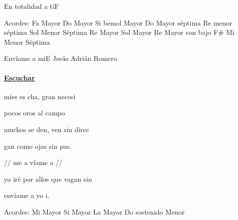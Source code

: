 \documentclass[12pt, spanish]{book}
\begin{document}
\begin{song}{En totalidad a tí}{F}
        \ifChordBk
        \begin{SBOpGroup}
            Acordes:
            \upchord{\F}\qquad Fa Mayor \hfill
            \upchord{\C}\qquad Do Mayor \hfill\null\break
            \upchord{\Bflat}\qquad Si bemol Mayor \hfill
            \upchord{\Cseven}\qquad Do Mayor s\'eptima \hfill\null\break
            \upchord{\Dmseven}\qquad Re menor s\'eptima \hfill
            \upchord{\Gmseven}\qquad Sol Menor S\'eptima \hfill\null\break
            \upchord{\D}\qquad Re Mayor \hfill
            \upchord{\G}\qquad Sol Mayor \hfill\null\break
            \upchord{\DFs}\qquad Re Mayor con bajo F\# \hfill
            \upchord{\Emseven}\qquad Mi Menor S\'eptima \hfill\null\break
        \end{SBOpGroup}
        \fi
    \end{song}

    \begin{song}{Envíame a mi}{E}
    {} %
    {Jesús Adrián Romero}
    {} %
    {}
        \ifChordBk
        \paragraph{\mbox{}\hfill\protect\href{https://open.spotify.com/intl-es/track/2FF17M1eTlWMEWD7odigXh}{Escuchar}\mbox{}\hfill}
        \fi

        \begin{SBOpGroup}
             mies es cha,  gran necesi

             pocos oros al campo 

             muchos se den, ven sin direc

            gan como ojas sin pas.
        \end{SBOpGroup}

        \begin{SBChorus}
            // me a víame a  //

            yo iré por allos que vagan sin 

            envíame a  yo i.
        \end{SBChorus}

        \ifChordBk
        \begin{SBOpGroup}
            Acordes:
            \upchord{\E}\qquad Mi Mayor \hfill
            \upchord{\B}\qquad Si Mayor \hfill\null\break
            \upchord{\A}\qquad La Mayor \hfill
            \upchord{\Csm}\qquad Do sostenido Menor \hfill\null\break
        \end{SBOpGroup}
        \fi
    \end{song}
\end{document}
